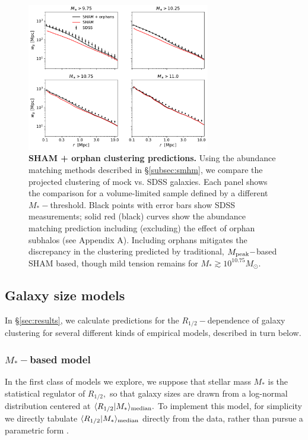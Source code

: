 \documentclass[usenatbib,usegraphicx,letterpaper]{mn2e}
\newcommand{\rhalf}{R_{1/2}}
\newcommand{\mstar}{M_{\ast}}
\newcommand{\mpeak}{M_{\rm peak}}
\newcommand{\median}[2]{\langle{#1}\vert{#2}\rangle_{\rm median}}
\newcommand{\msun}{M_\odot}
\begin{document}
\begin{figure}
\centering
\includegraphics[width=8cm]{FIGS/baseline_sham_orphans.pdf}
\caption{
{\bf SHAM + orphan clustering predictions.}
Using the abundance matching methods described in \S\ref{subsec:smhm}, we compare the projected clustering of mock vs. SDSS galaxies. Each panel shows the comparison for a volume-limited sample defined by a different $\mstar-$threshold. Black points with error bars show SDSS measurements; solid red (black) curves show the abundance matching prediction including (excluding) the effect of orphan subhalos (see Appendix A). Including orphans mitigates the discrepancy in the clustering predicted by traditional, $\mpeak-$based SHAM based, though mild tension remains for $\mstar\gtrsim10^{10.75}\msun.$
}
\label{fig:baseline_sham_clustering}
\end{figure}

\subsection{Galaxy size models}
\label{subsec:model}

In \S\ref{sec:results}, we calculate predictions for the $\rhalf-$dependence of galaxy clustering for several different kinds of empirical models, described in turn below.


\subsubsection{$\mstar-$based model}
\label{subsubsec:mstaronlymodel}

In the first class of models we explore, we suppose that stellar mass $\mstar$ is the statistical regulator of $\rhalf,$ so that galaxy sizes are drawn from a log-normal distribution centered at $\median{\rhalf}{\mstar}.$ To implement this model, for simplicity we directly tabulate $\median{\rhalf}{\mstar}$ directly from the data, rather than pursue a parametric form \citep[see, e.g.,][]{zhang_yang17}.
\end{document}
